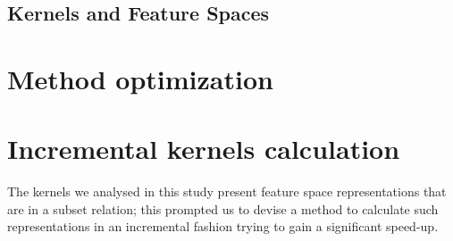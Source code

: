 

\subsection{Kernels and Feature Spaces}
\label{subsec:features}


\section{Method optimization}
\label{sec:opt}


\section{Incremental kernels calculation} 
\label{sec:inc}
The kernels we analysed in this study present feature space representations
that are in a subset relation; this prompted us to devise a method to calculate
such representations in an incremental fashion trying to gain a significant
speed-up.


